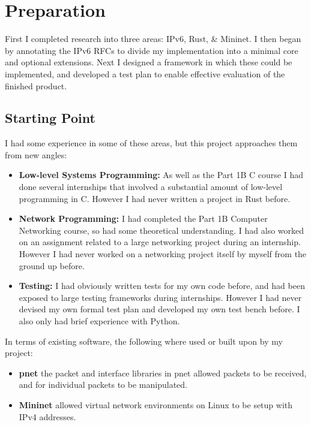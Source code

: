 \documentclass[12pt,a4paper,twoside,openright]{report}
\begin{document}
\chapter{Preparation}
\label{chap::preperation}

First I completed research into three areas: IPv6, Rust, \& Mininet. I then began by annotating the IPv6 RFCs\cite{ipv6_rfc}\cite{ipv6_rfc_adr}\cite{icmpv6_rfc} to divide my implementation into a minimal core and optional extensions. Next I designed a framework in which these could be implemented, and developed a test plan to enable effective evaluation of the finished product.

\section{Starting Point}
I had some experience in some of these areas, but this project approaches them from new angles:
\begin{itemize}
\item \textbf{Low-level Systems Programming:} As well as the Part 1B C course I had done several internships that involved a substantial amount of low-level programming in C. However I had never written a project in Rust before.
\item \textbf{Network Programming:} I had completed the Part 1B Computer Networking course, so had some theoretical understanding.  I had also worked on an assignment related to a large networking project during an internship.  However I had never worked on a networking project itself by myself from the ground up before.
\item \textbf{Testing:} I had obviously written tests for my own code before, and had been exposed to large testing frameworks during internships.  However I had never devised my own formal test plan and developed my own test bench before. I also only had brief experience with Python.
\end{itemize}
In terms of existing software, the following where used or built upon by my project:
\begin{itemize}
\item \textbf{pnet}\cite{pnet_rust} the packet and interface libraries in pnet allowed packets to be received, and for individual packets to be manipulated.
\item \textbf{Mininet}\cite{mininet} allowed virtual network environments on Linux to be setup with IPv4 addresses.
\end{itemize}
\end{document}
